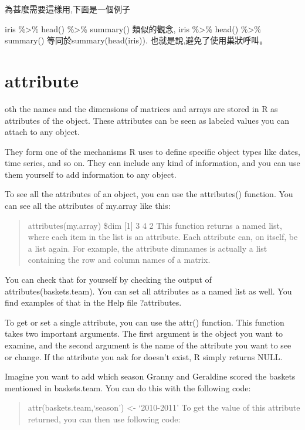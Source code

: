 \documentclass[]{book}
\theoremstyle{definition}
\theoremstyle{definition}
\theoremstyle{definition}
\theoremstyle{remark}
\begin{document}
為甚麼需要這樣用,下面是一個例子

iris \%\textgreater{}\% head() \%\textgreater{}\% summary() 類似的觀念,
iris \%\textgreater{}\% head() \%\textgreater{}\% summary()
等同於summary(head(iris)). 也就是說,避免了使用巢狀呼叫。

\hypertarget{attribute}{%
\section{attribute}\label{attribute}}

oth the names and the dimensions of matrices and arrays are stored in R
as attributes of the object. These attributes can be seen as labeled
values you can attach to any object.

They form one of the mechanisms R uses to define specific object types
like dates, time series, and so on. They can include any kind of
information, and you can use them yourself to add information to any
object.

To see all the attributes of an object, you can use the attributes()
function. You can see all the attributes of my.array like this:

\begin{quote}
attributes(my.array) \$dim {[}1{]} 3 4 2 This function returns a named
list, where each item in the list is an attribute. Each attribute can,
on itself, be a list again. For example, the attribute dimnames is
actually a list containing the row and column names of a matrix.
\end{quote}

You can check that for yourself by checking the output of
attributes(baskets.team). You can set all attributes as a named list as
well. You find examples of that in the Help file ?attributes.

To get or set a single attribute, you can use the attr() function. This
function takes two important arguments. The first argument is the object
you want to examine, and the second argument is the name of the
attribute you want to see or change. If the attribute you ask for
doesn't exist, R simply returns NULL.

Imagine you want to add which season Granny and Geraldine scored the
baskets mentioned in baskets.team. You can do this with the following
code:

\begin{quote}
attr(baskets.team,`season') \textless{}- `2010-2011' To get the value of
this attribute returned, you can then use following code:
\end{quote}
\end{document}
